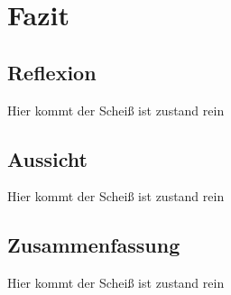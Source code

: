 
\chapter{Fazit}



\section{Reflexion}
Hier kommt der Scheiß ist zustand rein

\section{Aussicht}
Hier kommt der Scheiß ist zustand rein

\section{Zusammenfassung}
Hier kommt der Scheiß ist zustand rein

